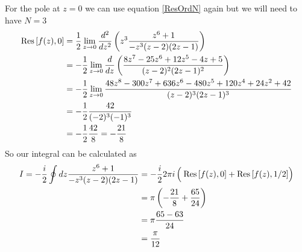 \documentclass[11pt]{article}
\numberwithin{equation}{section}
\begin{document}
For the pole at $z=0$ we can use equation \ref{ResOrdN} again but we will need to have $N=3$
\begin{align*}
\textnormal{Res}\left[{f(z)},{0}\right] &= \frac{1}{2}\lim_{z\rightarrow{0}}\frac{d^{2}}{dz^{2}}\left(z^3\frac{z^6+1}{-z^3(z-2)(2z-1)}\right)\\
&= -\frac{1}{2}\lim_{z\rightarrow{0}}\frac{d}{dz}\left(\frac{8z^7-25z^6+12z^5-4z+5}{(z-2)^2(2z-1)^2}\right)\\
&= -\frac{1}{2}\lim_{z\rightarrow{0}}\frac{48z^8-300z^7+636z^6-480z^5+120z^4+24z^2+42}{(z-2)^3(2z-1)^3}\\
&= -\frac{1}{2}\frac{42}{(-2)^3(-1)^3}\\
&= -\frac{1}{2}\frac{42}{8} = -\frac{21}{8}
\end{align*}
So our integral can be calculated as
\begin{align*}
I = -\frac{i}{2}\oint dz\frac{z^6+1}{-z^3(z-2)(2z-1)} &= -\frac{i}{2}2\pi{i}\left(\frac{}{}\textnormal{Res}\left[{f(z)},{0}\right]+\textnormal{Res}\left[{f(z)},{1/2}\right]\right)\\
&= \pi\left(-\frac{21}{8}+\frac{65}{24}\right)\\
&= \pi\frac{65-63}{24}\\
&= \frac{\pi}{12}
\end{align*}

\pagebreak
\end{document}
